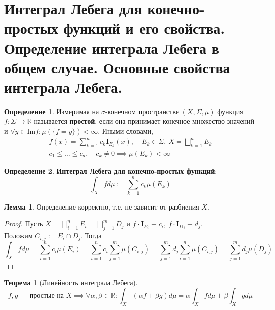 \documentclass[11pt,a4paper]{report}
\def\Real{\mathbb{R}}
\theoremstyle{definition}
\theoremstyle{definition}
\newtheorem{theorem}{Теорема}[section]
\newtheorem{lemma}{Лемма}[section]
\theoremstyle{definition}
\newtheorem{definition}{Определение}[section]
\begin{document}
	\section{Интеграл Лебега для конечно-простых функций и его свойства. Определение интеграла Лебега в общем случае. Основные свойства интеграла Лебега.}
		\begin{definition}
			Измеримая на $ \sigma $-конечном пространстве $ (X, \Sigma, \mu) $ функция $ f: \Sigma \to \Real $ называется \textbf{простой}, если она принимает конечное множество значений и $ \forall y \in \mbox{Im} f: \mu(\{f = y\}) < \infty $. Иными словами, 
			\begin{gather*}
				f(x) = \sum_{k=1}^{n} c_{k} \mathbf{I}_{E_{k}}(x),\quad E_{k} \in \Sigma,\ X = \bigsqcup\limits_{k=1}^{n} E_{k}\\
				c_{1} \le \dots \le c_{n},\quad c_{k} \neq 0 \implies \mu(E_{k}) < \infty
			\end{gather*}
		\end{definition}
		\begin{definition}
			\textbf{Интеграл Лебега для конечно-простых функций}:
			\[ \int_{X} f d\mu := \sum_{k=1}^{n} c_{k} \mu(E_{k})  \]
		\end{definition}
		\begin{lemma}
			Определение корректно, т.е. не зависит от разбиения $ X $.
		\end{lemma}
		\begin{proof}
			Пусть $ X = \bigsqcup\limits_{i=1}^{n} E_{i} = \bigsqcup\limits_{j=1}^{m} D_{j} $ и $ f \cdot \mathbf{I}_{E_{i}} \equiv c_{i},\ f \cdot \mathbf{I}_{D_{j}} \equiv d_{j} $.\\ 
			Положим $ C_{i, j} := E_{i} \cap D_{j} $. Тогда 
			\[ \int_{X} f d\mu = \sum\limits_{i=1}^{n} c_{i} \mu(E_{i})  = \sum\limits_{i=1}^{n} c_{i} \sum\limits_{j=1}^{m} \mu(C_{i, j}) = \sum\limits_{j=1}^{m} d_{j} \sum\limits_{i=1}^{n} \mu(C_{i, j}) = \sum\limits_{j=1}^{m} d_{j} \mu(D_{j}) \]
		\end{proof}
		\begin{theorem}[Линейность интеграла Лебега]$  $
			\[ f, g \text{ — простые на } X \implies \forall \alpha, \beta \in \Real: \int_{X} (\alpha f + \beta g) d\mu = \alpha \int_{X} f d\mu + \beta \int_{X} g d\mu \] 
		\end{theorem}
\end{document}
